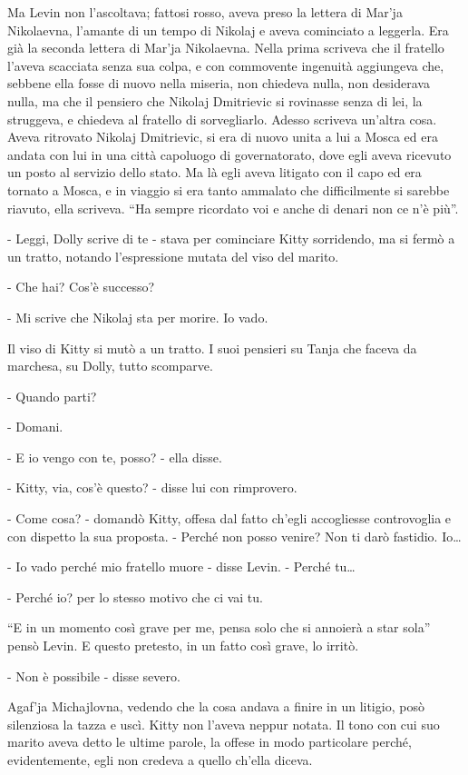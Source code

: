 Ma Levin non l'ascoltava; fattosi rosso, aveva preso la lettera di Mar'ja Nikolaevna, l'amante di un tempo di Nikolaj e aveva cominciato a leggerla. Era già la seconda lettera di Mar'ja Nikolaevna. Nella prima scriveva che il fratello l'aveva scacciata senza sua colpa, e con commovente ingenuità aggiungeva che, sebbene ella fosse di nuovo nella miseria, non chiedeva nulla, non desiderava nulla, ma che il pensiero che Nikolaj Dmitrievic si rovinasse senza di lei, la struggeva, e chiedeva al fratello di sorvegliarlo. Adesso scriveva un'altra cosa. Aveva ritrovato Nikolaj Dmitrievic, si era di nuovo unita a lui a Mosca ed era andata con lui in una città capoluogo di governatorato, dove egli aveva ricevuto un posto al servizio dello stato. Ma là egli aveva litigato con il capo ed era tornato a Mosca, e in viaggio si era tanto ammalato che difficilmente si sarebbe riavuto, ella scriveva. ``Ha sempre ricordato voi e anche di denari non ce n'è più''. 

- Leggi, Dolly scrive di te - stava per cominciare Kitty sorridendo, ma si fermò a un tratto, notando l'espressione mutata del viso del marito. 

- Che hai? Cos'è successo? 

- Mi scrive che Nikolaj sta per morire. Io vado. 

Il viso di Kitty si mutò a un tratto. I suoi pensieri su Tanja che faceva da marchesa, su Dolly, tutto scomparve. 

- Quando parti? 

- Domani. 

- E io vengo con te, posso? - ella disse. 

- Kitty, via, cos'è questo? - disse lui con rimprovero. 

- Come cosa? - domandò Kitty, offesa dal fatto ch'egli accogliesse controvoglia e con dispetto la sua proposta. - Perché non posso venire? Non ti darò fastidio. Io\ldots{} 

- Io vado perché mio fratello muore - disse Levin. - Perché tu\ldots{} 

- Perché io? per lo stesso motivo che ci vai tu. 

``E in un momento così grave per me, pensa solo che si annoierà a star sola'' pensò Levin. E questo pretesto, in un fatto così grave, lo irritò. 

- Non è possibile - disse severo. 

Agaf'ja Michajlovna, vedendo che la cosa andava a finire in un litigio, posò silenziosa la tazza e uscì. Kitty non l'aveva neppur notata. Il tono con cui suo marito aveva detto le ultime parole, la offese in modo particolare perché, evidentemente, egli non credeva a quello ch'ella diceva. 

